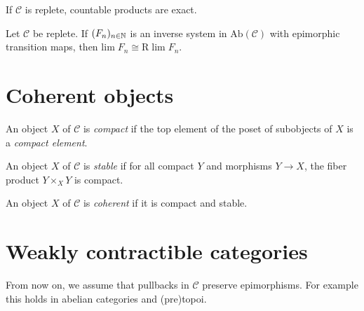 \begin{proposition}
    If $\mathcal{C}$ is replete, countable products are exact.
    \label{prop:replete-products-exact}
\end{proposition}

\begin{proposition}
    Let $\mathcal{C}$ be replete.
    If $(F_n)_{n \in \mathbb{N}}$ is an inverse system in $\mathrm{Ab}(\mathcal{C})$ with
    epimorphic transition maps, then $\mathrm{lim} \; F_n \cong \mathrm{R}\; \mathrm{lim} \; F_n$.
    \label{prop:lim-exact-replete}
\end{proposition}

\section{Coherent objects}

\begin{definition}
    An object $X$ of $\mathcal{C}$ is \emph{compact} if the top element of the poset
    of subobjects of $X$ is a \emph{compact element}.
    \label{def:compact-object}
\end{definition}

\begin{definition}
    An object $X$ of $\mathcal{C}$ is \emph{stable} if for all compact $Y$ and morphisms $Y \to X$,
    the fiber product $Y \times_{X} Y$ is compact.
    \label{def:stable-object}
\end{definition}

\begin{definition}
    An object $X$ of $\mathcal{C}$ is \emph{coherent} if it is compact and stable.
    \label{def:coherent-object}
\end{definition}

\section{Weakly contractible categories}

From now on, we assume that pullbacks in $\mathcal{C}$ preserve epimorphisms. For example
this holds in abelian categories and (pre)topoi.

